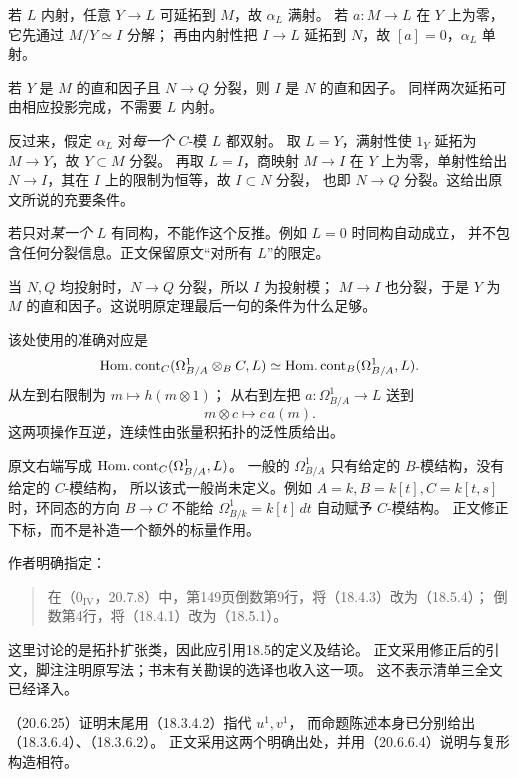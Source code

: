 若 $L$ 内射，任意 $Y\to L$ 可延拓到 $M$，故 $\alpha_L$ 满射。
若 $a:M\to L$ 在 $Y$ 上为零，它先通过 $M/Y\simeq I$ 分解；
再由内射性把 $I\to L$ 延拓到 $N$，故 $[a]=0$，$\alpha_L$ 单射。

若 $Y$ 是 $M$ 的直和因子且 $N\to Q$ 分裂，则 $I$ 是 $N$ 的直和因子。
同样两次延拓可由相应投影完成，不需要 $L$ 内射。

反过来，假定 $\alpha_L$ 对\emph{每一个} $C$-模 $L$ 都双射。
取 $L=Y$，满射性使 $1_Y$ 延拓为 $M\to Y$，故 $Y\subset M$ 分裂。
再取 $L=I$，商映射 $M\to I$ 在 $Y$ 上为零，单射性给出
$N\to I$，其在 $I$ 上的限制为恒等，故 $I\subset N$ 分裂，
也即 $N\to Q$ 分裂。这给出原文所说的充要条件。

若只对\emph{某一个} $L$ 有同构，不能作这个反推。例如 $L=0$ 时同构自动成立，
并不包含任何分裂信息。正文保留原文“对所有 $L$”的限定。

当 $N,Q$ 均投射时，$N\to Q$ 分裂，所以 $I$ 为投射模；
$M\to I$ 也分裂，于是 $Y$ 为 $M$ 的直和因子。这说明原定理最后一句的条件为什么足够。

该处使用的准确对应是
\[
 \operatorname{Hom.cont}_C(\Omega^1_{B/A}\otimes_B C,L)
 \simeq \operatorname{Hom.cont}_B(\Omega^1_{B/A},L).
\]
从左到右限制为 $m\mapsto h(m\otimes1)$；
从右到左把 $a:\Omega^1_{B/A}\to L$ 送到
\[
 m\otimes c\longmapsto c\,a(m).
\]
这两项操作互逆，连续性由张量积拓扑的泛性质给出。

原文右端写成 $\operatorname{Hom.cont}_C(\Omega^1_{B/A},L)$。
一般的 $\Omega^1_{B/A}$ 只有给定的 $B$-模结构，没有给定的 $C$-模结构，
所以该式一般尚未定义。例如 $A=k,B=k[t],C=k[t,s]$ 时，环同态的方向
$B\to C$ 不能给 $\Omega^1_{B/k}=k[t]\,dt$ 自动赋予 $C$-模结构。
正文修正下标，而不是补造一个额外的标量作用。

作者明确指定：
\begin{quote}
在（$0_{\mathrm{IV}}$，20.7.8）中，第149页倒数第9行，将（18.4.3）改为（18.5.4）；
倒数第4行，将（18.4.1）改为（18.5.1）。
\end{quote}
这里讨论的是拓扑扩张类，因此应引用18.5的定义及结论。
正文采用修正后的引文，脚注注明原写法；书末有关勘误的选译也收入这一项。
这不表示清单三全文已经译入。

（20.6.25）证明末尾用（18.3.4.2）指代 $u^1,v^1$，
而命题陈述本身已分别给出（18.3.6.4）、（18.3.6.2）。
正文采用这两个明确出处，并用（20.6.6.4）说明与复形构造相符。

